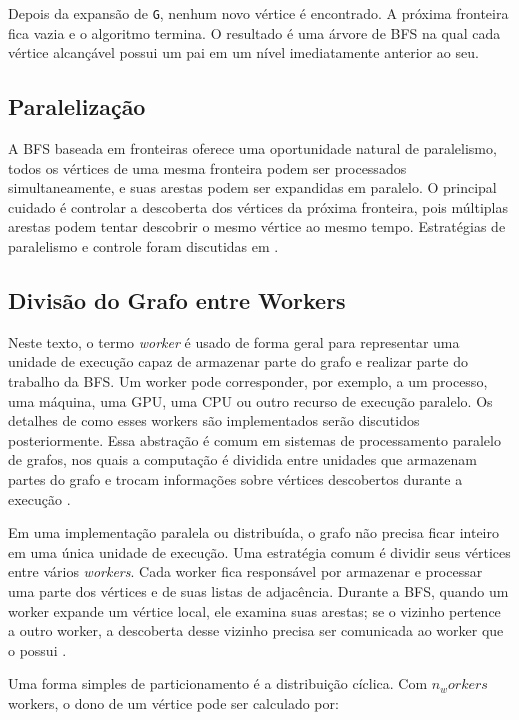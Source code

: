 Depois da expansão de \texttt{G}, nenhum novo vértice é encontrado. A próxima
fronteira fica vazia e o algoritmo termina. O resultado é uma árvore de BFS na
qual cada vértice alcançável possui um pai em um nível imediatamente anterior ao
seu.

\subsection{Paralelização}
\label{sec:bfs-paralelizacao}
A BFS baseada em fronteiras oferece uma oportunidade natural de paralelismo, todos
os vértices de uma mesma fronteira podem ser processados simultaneamente, e suas
arestas podem ser expandidas em paralelo. O principal cuidado é controlar a
descoberta dos vértices da próxima fronteira, pois múltiplas arestas podem tentar
descobrir o mesmo vértice ao mesmo tempo. Estratégias de paralelismo e controle foram
discutidas em \cite{merrillgpu}. 

\subsection{Divisão do Grafo entre Workers}
\label{sec:bfs-divisao-grafo}
Neste texto, o termo \textit{worker} é usado de forma geral para representar uma
unidade de execução capaz de armazenar parte do grafo e realizar parte do trabalho
da BFS. Um worker pode corresponder, por exemplo, a um processo, uma máquina, uma
GPU, uma CPU ou outro recurso de execução paralelo. Os detalhes de como esses
workers são implementados serão discutidos posteriormente. Essa abstração é
comum em sistemas de processamento paralelo de grafos, nos quais a computação é
dividida entre unidades que armazenam partes do grafo e trocam informações sobre
vértices descobertos durante a execução \cite{merrillgpu}.

Em uma implementação paralela ou distribuída, o grafo não precisa ficar inteiro
em uma única unidade de execução. Uma estratégia comum é dividir seus vértices entre vários
\textit{workers}. Cada worker fica responsável por armazenar e processar uma
parte dos vértices e de suas listas de adjacência. Durante a BFS, quando um
worker expande um vértice local, ele examina suas arestas; se o vizinho pertence
a outro worker, a descoberta desse vizinho precisa ser comunicada ao worker que
o possui \cite{merrillgpu}.

Uma forma simples de particionamento é a distribuição cíclica. Com $n_workers$
workers, o dono de um vértice pode ser calculado por:

